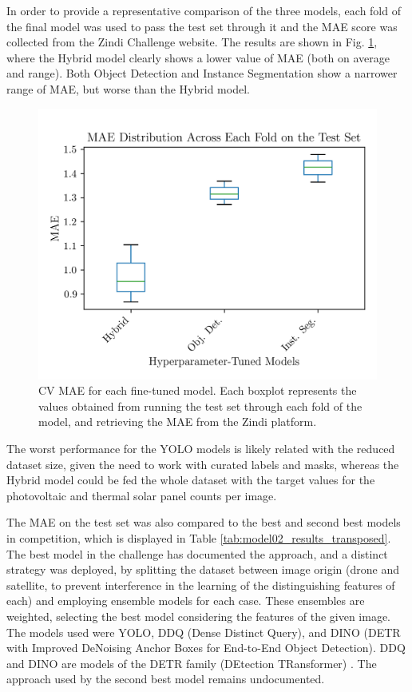 \documentclass[conference]{IEEEtran}
\begin{document}
In order to provide a representative comparison of the three models, each fold of the final model was used to pass the test set through it and the MAE score was collected from the Zindi Challenge website. The results are shown in Fig. \ref{fig:results_mae_boxplot}, where the Hybrid model clearly shows a lower value of MAE (both on average and range). Both Object Detection and Instance Segmentation show a narrower range of MAE, but worse than the Hybrid model.
\begin{figure}[H]
    \centering
    \includegraphics[width=1\linewidth]{assets/results_mae_boxplot.png}
    \caption{CV MAE for each fine-tuned model. Each boxplot represents the values obtained from running the test set through each fold of the model, and retrieving the MAE from the Zindi platform.}
    \label{fig:results_mae_boxplot}
\end{figure}

The worst performance for the YOLO models is likely related with the reduced dataset size, given the need to work with curated labels and masks, whereas the Hybrid model could be fed the whole dataset with the target values for the photovoltaic and thermal solar panel counts per image.

The MAE on the test set was also compared to the best and second best models in competition, which is displayed in Table \ref{tab:model02_results_transposed}. The best model in the challenge has documented the approach, and a distinct strategy was deployed, by splitting the dataset between image origin (drone and satellite, to prevent interference in the learning of the distinguishing features of each) and employing ensemble models for each case. These ensembles are weighted, selecting the best model considering the features of the given image. The models used were YOLO, DDQ (Dense Distinct Query), and DINO (DETR with Improved DeNoising Anchor Boxes for End-to-End Object Detection). DDQ and DINO are models of the DETR family (DEtection TRansformer) \cite{zindi_lacuna_solar_survey}. The approach used by the second best model remains undocumented.
\end{document}
